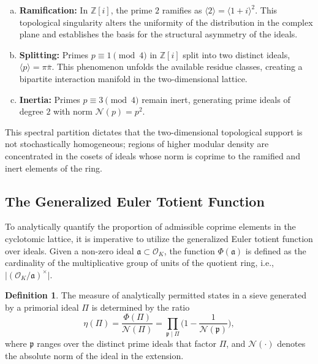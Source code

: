 \documentclass{article}
\numberwithin{equation}{section}
\theoremstyle{plain}
\theoremstyle{definition}
\newtheorem{definition}[theorem]{Definition}
\begin{document}
\begin{enumerate}[(a)]
    \item \textbf{Ramification:} In $\mathbb{Z}[i]$, the prime $2$ ramifies as $\langle 2 \rangle = \langle 1+i \rangle^2$. This topological singularity alters the uniformity of the distribution in the complex plane and establishes the basis for the structural asymmetry of the ideals.
    \item \textbf{Splitting:} Primes $p \equiv 1 \pmod 4$ in $\mathbb{Z}[i]$ split into two distinct ideals, $\langle p \rangle = \pi \bar{\pi}$. This phenomenon unfolds the available residue classes, creating a bipartite interaction manifold in the two-dimensional lattice.
    \item \textbf{Inertia:} Primes $p \equiv 3 \pmod 4$ remain inert, generating prime ideals of degree $2$ with norm $\mathcal{N}(p) = p^2$.
\end{enumerate}

This spectral partition dictates that the two-dimensional topological support is not stochastically homogeneous; regions of higher modular density are concentrated in the cosets of ideals whose norm is coprime to the ramified and inert elements of the ring.

\subsection{The Generalized Euler Totient Function}

To analytically quantify the proportion of admissible coprime elements in the cyclotomic lattice, it is imperative to utilize the generalized Euler totient function over ideals. Given a non-zero ideal $\mathfrak{a} \subset \mathcal{O}_K$, the function $\Phi(\mathfrak{a})$ is defined as the cardinality of the multiplicative group of units of the quotient ring, i.e., $\lvert(\mathcal{O}_K/\mathfrak{a})^\times\rvert$.

\begin{definition}
The measure of analytically permitted states in a sieve generated by a primorial ideal $\Pi$ is determined by the ratio
\begin{equation}
    \eta(\Pi) = \frac{\Phi(\Pi)}{\mathcal{N}(\Pi)} = \prod_{\mathfrak{p} \mid \Pi} \bigg( 1 - \frac{1}{\mathcal{N}(\mathfrak{p})} \bigg),
\end{equation}
where $\mathfrak{p}$ ranges over the distinct prime ideals that factor $\Pi$, and $\mathcal{N}(\cdot)$ denotes the absolute norm of the ideal in the extension.
\end{definition}
\end{document}
